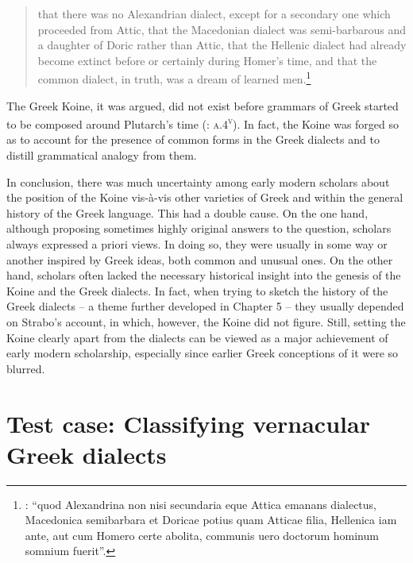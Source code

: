 {\begin{quote}
that there was no Alexandrian dialect, except for a secondary one which proceeded from Attic, that the Macedonian dialect was semi-barbarous and a daughter of Doric rather than Attic, that the Hellenic dialect had already become extinct before or certainly during Homer’s time, and that the common dialect, in truth, was a dream of learned men.\footnote{\citet[\textsc{c.2}\textsc{\textsuperscript{v}}]{Kirchmaier1709}: “quod Alexandrina non nisi secundaria eque Attica emanans dialectus, Macedonica semibarbara et Doricae potius quam Atticae filia, Hellenica iam ante, aut cum Homero certe abolita, communis uero doctorum hominum somnium fuerit”.}
\end{quote}

The Greek Koine, it was argued, did not exist before grammars of Greek started to be composed around Plutarch’s time (\citealt{Kirchmaier1709}: \textsc{a.4}\textsc{\textsuperscript{v}}). In fact, the Koine was forged so as to account for the presence of common forms in the Greek dialects and to distill grammatical analogy from them.

In conclusion, there was much uncertainty among early modern scholars about the position of the Koine vis-à-vis other varieties of Greek and within the general history of the Greek language. This had a double cause. On the one hand, although proposing sometimes highly original answers to the question, scholars always expressed a priori views. In doing so, they were usually in some way or another inspired by Greek ideas, both common and unusual ones. On the other hand, scholars often lacked the necessary historical insight into the genesis of the Koine and the Greek dialects. In fact, when trying to sketch the history of the Greek dialects – a theme further developed in Chapter 5 – they usually depended on Strabo’s account, in which, however, the Koine did not figure. Still, setting the Koine clearly apart from the dialects can be viewed as a major achievement of early modern scholarship, especially since earlier Greek conceptions of it were so blurred.

\section{Test case: Classifying vernacular Greek dialects}\label{sec:2.10}

}
